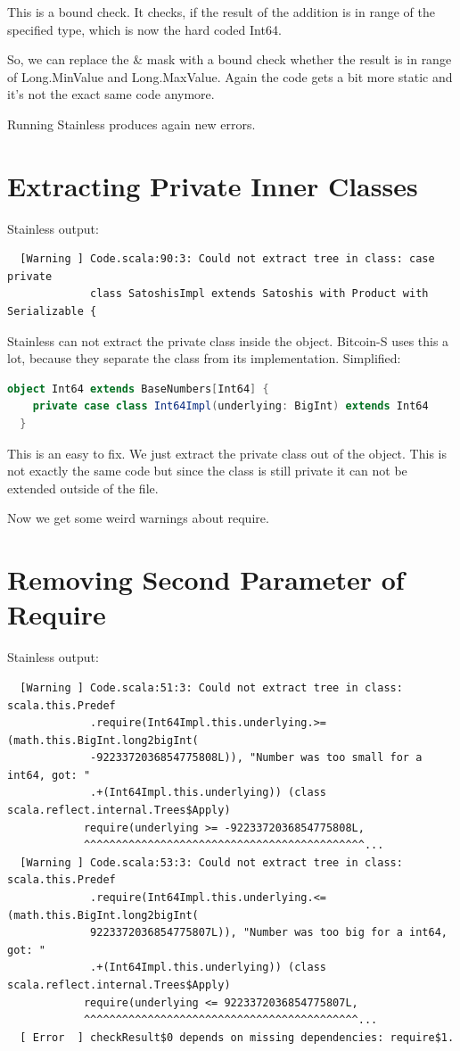 This is a bound check.
It checks, if the result of the addition is in range of the specified type, which is now the hard coded Int64.

So, we can replace the \& mask with a bound check whether the result is in range of Long.MinValue and Long.MaxValue.
Again the code gets a bit more static and it's not the exact same code anymore.

Running Stainless produces again new errors.


\section{Extracting Private Inner Classes}

Stainless output:
{\footnotesize\begin{verbatim}
  [Warning ] Code.scala:90:3: Could not extract tree in class: case private
             class SatoshisImpl extends Satoshis with Product with Serializable {
\end{verbatim}}

Stainless can not extract the private class inside the object.
Bitcoin-S uses this a lot, because they separate the class from its implementation.
Simplified:
\begin{lstlisting}[language=scala]
  object Int64 extends BaseNumbers[Int64] {
    private case class Int64Impl(underlying: BigInt) extends Int64 
  }
\end{lstlisting}

This is an easy to fix.
We just extract the private class out of the object.
This is not exactly the same code but since the class is still private it can not be extended outside of the file.

Now we get some weird warnings about require.


\section{Removing Second Parameter of Require}

Stainless output:
{\footnotesize\begin{verbatim}
  [Warning ] Code.scala:51:3: Could not extract tree in class: scala.this.Predef
             .require(Int64Impl.this.underlying.>=(math.this.BigInt.long2bigInt(
             -9223372036854775808L)), "Number was too small for a int64, got: "
             .+(Int64Impl.this.underlying)) (class scala.reflect.internal.Trees$Apply)
            require(underlying >= -9223372036854775808L,
            ^^^^^^^^^^^^^^^^^^^^^^^^^^^^^^^^^^^^^^^^^^^^...
  [Warning ] Code.scala:53:3: Could not extract tree in class: scala.this.Predef
             .require(Int64Impl.this.underlying.<=(math.this.BigInt.long2bigInt(
             9223372036854775807L)), "Number was too big for a int64, got: "
             .+(Int64Impl.this.underlying)) (class scala.reflect.internal.Trees$Apply)
            require(underlying <= 9223372036854775807L,
            ^^^^^^^^^^^^^^^^^^^^^^^^^^^^^^^^^^^^^^^^^^^...
  [ Error  ] checkResult$0 depends on missing dependencies: require$1.
\end{verbatim}}

